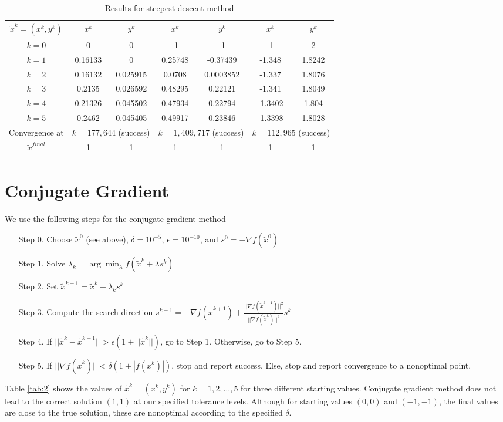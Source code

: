\documentclass[11pt]{article}
\newcommand{\1}{\mathbbm{1}}
\begin{document}
\begin{table}[H]
	\small
	\centering
	\begin{tabular}{|c| c c| c c|c c| }
		\hline
		\hline                                                
	 $\tilde{x}^k=(x^k,y^k)$  & $x^{k}$    & $y^k$      	 &	$x^{k}$    & $y^k$     		&  $x^{k}$     &$y^k$      \\ 
	         \hline
	$k=0$	&	0		&	0		 &	-1		&		-1		& -1		 &	2      \\
	$k=1$  &  0.16133 &          0 &   0.25748 &     -0.37439 &     -1.348 &   1.8242\\
	$k=2$  &  0.16132 &   0.025915 &    0.0708 &    0.0003852 &     -1.337 &   1.8076\\
	$k=3$  &   0.2135 &   0.026592 &   0.48295 &      0.22121 &     -1.341 &   1.8049\\
	$k=4$  &  0.21326 &   0.045502 &   0.47934 &      0.22794 &    -1.3402 &    1.804\\
	$k=5$  &   0.2462 &   0.045405 &   0.49917 &      0.23846 &    -1.3398 &   1.8028\\
		\hline
		Convergence at &	\multicolumn{2}{c}{$k= 177,644$ (success)}& \multicolumn{2}{|c|}{$k=1,409,717$ (success)}&\multicolumn{2}{|c|}{$k=112,965$ (success)}\\
		\hline
		$\tilde{x}^{final}$&	1&1&1 & 1 &  1 & 1\\
		\hline
		\hline
		\end{tabular} 
	\caption{Results for steepest descent method}
	\label{tab:1}
\end{table}

\section{Conjugate Gradient}
We use the following steps for the conjugate gradient method
\begin{enumerate}
	\item[Step 0.] Choose $\tilde{x}^0$ (see above), $\delta = 10^{-5}$, $\epsilon = 10^{-10}$, and $s^0 = -\nabla f(\tilde{x}^0)$  
	\item[Step 1.] Solve $\lambda_k=\arg \min_{\lambda} f(\tilde{x}^k+\lambda s^k)$
	\item[Step 2.] Set $\tilde{x}^{k+1}=\tilde{x}^k+\lambda_k s^k$
	\item[Step 3.] Compute the search direction
	$s^{k+1} = -\nabla f(\tilde{x}^{k+1})+\frac{||\nabla f(\tilde{x}^{k+1})||^2}{||\nabla f(\tilde{x}^{k})||^2}s^k$
	\item [Step 4.]	If $||\tilde{x}^{k}-\tilde{x}^{k+1}||>\epsilon (1+||\tilde{x}^{k}||)$, go to Step 1. Otherwise, go to Step 5.
	\item[Step 5.] If $||\nabla f(\tilde{x}^k)||<\delta(1+|f(x^k)|)$, stop and report success. Else, stop and report convergence to a nonoptimal point.
\end{enumerate}
Table \ref{tab:2} shows the values of $\tilde{x}^k=(x^k,y^k)$ for $k=1,2,\ldots,5$ for three different starting values. Conjugate gradient method does not lead to the correct solution $(1,1)$ at our specified tolerance levels. Although for starting values $(0,0)$ and $(-1,-1)$, the final values are close to the true solution, these are nonoptimal according to the specified $\delta$.
\end{document}
